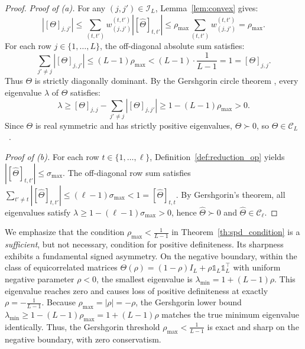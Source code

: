 \documentclass[default,sn-mathphys,Numbered]{sn-jnl}
\theoremstyle{thmstyleone}
\theoremstyle{thmstylethree}
\theoremstyle{thmstyletwo}
\begin{document}
\begin{proof}
\textit{Proof of (a).} For any $(j, j') \in \mathcal{I}_L$, Lemma~\ref{lem:convex} gives:
\begin{equation}
|[\Theta]_{j, j'}| \le \sum_{(t,t')} w_{(j,j')}^{(t,t')} |[\hat{\Theta}]_{t, t'}| \le \rho_{\max} \sum_{(t,t')} w_{(j,j')}^{(t,t')} = \rho_{\max}.
\end{equation}
For each row $j \in \{1, \ldots, L\}$, the off-diagonal absolute sum satisfies:
\begin{equation}
\sum_{j' \neq j} |[\Theta]_{j, j'}| \le (L - 1) \rho_{\max} < (L - 1) \cdot \frac{1}{L - 1} = 1 = [\Theta]_{j, j}.
\end{equation}
Thus $\Theta$ is strictly diagonally dominant. By the Gershgorin circle theorem \citep[Theorem~6.1.1]{horn2012matrix}, every eigenvalue $\lambda$ of $\Theta$ satisfies:
\begin{equation}
\lambda \ge [\Theta]_{j, j} - \sum_{j' \neq j} |[\Theta]_{j, j'}| \ge 1 - (L - 1)\rho_{\max} > 0.
\end{equation}
Since $\Theta$ is real symmetric and has strictly positive eigenvalues, $\Theta \succ 0$, so $\Theta \in \mathcal{C}_L$~\citep{schurmatapp}.

\textit{Proof of (b).} For each row $t \in \{1, \ldots, \ell\}$, Definition~\ref{def:reduction_op} yields $|[\hat{\Theta}]_{t, t'}| \le \sigma_{\max}$. The off-diagonal row sum satisfies $\sum_{t' \neq t} |[\hat{\Theta}]_{t, t'}| \le (\ell - 1)\sigma_{\max} < 1 = [\hat{\Theta}]_{t, t}$. By Gershgorin's theorem, all eigenvalues satisfy $\lambda \ge 1 - (\ell - 1)\sigma_{\max} > 0$, hence $\hat{\Theta} \succ 0$ and $\hat{\Theta} \in \mathcal{C}_\ell$.
\end{proof}


We emphasize that the condition $\rho_{\max} < \frac{1}{L - 1}$ in Theorem~\ref{th:spd_condition} is a \textit{sufficient}, but not necessary, condition for positive definiteness. Its sharpness exhibits a fundamental signed asymmetry.
On the negative boundary, within the class of equicorrelated matrices $\Theta(\rho) = (1-\rho)I_L + \rho \mathds{1}_L \mathds{1}_L^\top$ with uniform negative parameter $\rho < 0$, the smallest eigenvalue is $\lambda_{\min} = 1 + (L-1)\rho$. This eigenvalue reaches zero and causes loss of positive definiteness at exactly $\rho = -\frac{1}{L-1}$. Because $\rho_{\max} = |\rho| = -\rho$, the Gershgorin lower bound $\lambda_{\min} \ge 1 - (L-1)\rho_{\max} = 1 + (L-1)\rho$ matches the true minimum eigenvalue identically. Thus, the Gershgorin threshold $\rho_{\max} < \frac{1}{L-1}$ is exact and sharp on the negative boundary, with zero conservatism.
\end{document}
